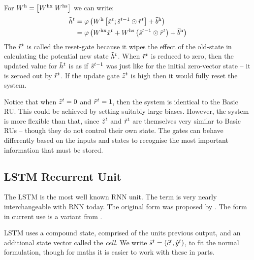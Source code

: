 \documentclass[12pt,parskip]{komatufte}
\begin{document}
For $\d W_h = \left[\d W_{hx}\; \d W_{hs} \right]$ we can write:
\begin{align}
\nv h_t &= \varphi \left( \d W_h\left[\nv x_t; \nv s_{t-1} \odot \nv r_t\right] + \dv b_h \right)  \\
&= \varphi \left( \d W_{hx} \nv x_t + \d W_{hs} \left( \nv s_{t-1} \odot \nv r_t \right) + \dv b_h \right)
\end{align}
%
The $\nv r_t$ is called the reset-gate because it wipes the effect of the old-state in calculating the potential new state $\nv h_t$.
When $\nv r_t$ is reduced to zero, then the updated value for $\nv h_t$ is as if $\nv s_{t-1}$ was just like for the initial zero-vector state -- it is zeroed out by $\nv r_t$.
If the update gate $\nv z_t$ is high then it would fully reset the system.


Notice that when $\nv z_t=0$ and $\nv r_t=1$, then the system is identical to the Basic RU.
This could be achieved by setting suitably large biases.
However, the system is more flexible than that, 
since $\nv z_t$ and $\nv r_t$ are themselves very similar to Basic RUs -- though they do not control their own state.
The gates can behave differently based on the inputs and states to recognise the most important information that must be stored.



\subsection{LSTM Recurrent Unit}\label{sec:ltsm}
The LSTM is the most well known RNN unit.
The term is very nearly interchangeable with RNN today.
The original form was proposed by .
The form in current use is a variant from .

LSTM uses a compound state, comprised of the units previous output, and an additional state vector called the \emph{cell}.
We write $\nv s_t = (\nv c_t, \n \hat{y}_t)$,
to fit the normal formulation,
though for maths it is easier to work with these in parts.

\end{document}
